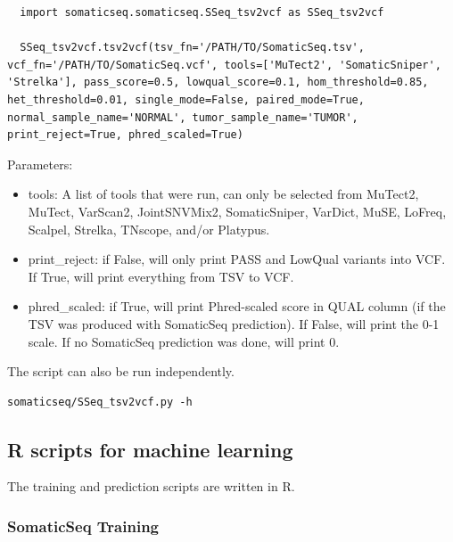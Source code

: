 \documentclass[10pt,letterpaper]{article}
\begin{document}
\begin{sloppypar}
\begin{lstlisting}
  import somaticseq.somaticseq.SSeq_tsv2vcf as SSeq_tsv2vcf
  
  SSeq_tsv2vcf.tsv2vcf(tsv_fn='/PATH/TO/SomaticSeq.tsv', vcf_fn='/PATH/TO/SomaticSeq.vcf', tools=['MuTect2', 'SomaticSniper', 'Strelka'], pass_score=0.5, lowqual_score=0.1, hom_threshold=0.85, het_threshold=0.01, single_mode=False, paired_mode=True, normal_sample_name='NORMAL', tumor_sample_name='TUMOR', print_reject=True, phred_scaled=True)
\end{lstlisting}

Parameters:

\begin{itemize}

\item tools: A list of tools that were run, can only be selected from MuTect2, MuTect, VarScan2, JointSNVMix2, SomaticSniper, VarDict, MuSE, LoFreq, Scalpel, Strelka, TNscope, and/or Platypus. 

\item print\_reject: if False, will only print PASS and LowQual variants into VCF. If True, will print everything from TSV to VCF. 

\item phred\_scaled: if True, will print Phred-scaled score in QUAL column (if the TSV was produced with SomaticSeq prediction). If False, will print the 0-1 scale. If no SomaticSeq prediction was done, will print 0. 


\end{itemize}

The script can also be run independently. 

\begin{lstlisting}
somaticseq/SSeq_tsv2vcf.py -h
\end{lstlisting}





\subsection{R scripts for machine learning} \label{module:r_scripts}

The training and prediction scripts are written in R.

\subsubsection{SomaticSeq Training} \label{module:r_train}


\end{sloppypar}
\end{document}
